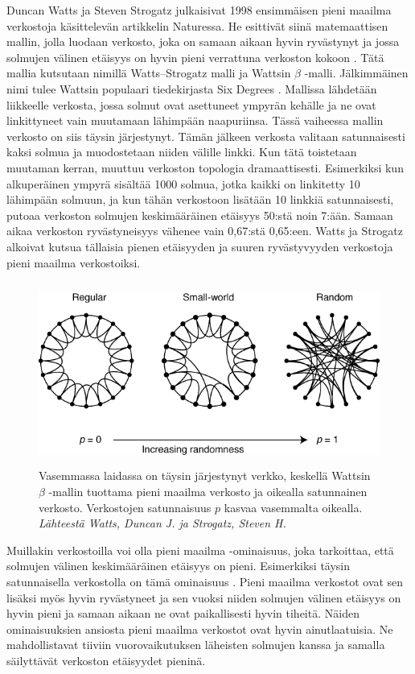 \documentclass[finnish,12pt,a4paper,pdftex,elec,utf8]{aaltothesis}
\begin{document}
Duncan Watts ja Steven Strogatz julkaisivat 1998 ensimmäisen pieni maailma verkostoja käsittelevän artikkelin Naturessa. He esittivät siinä matemaattisen mallin, jolla luodaan verkosto, joka on samaan aikaan hyvin ryvästynyt ja jossa solmujen välinen etäisyys on hyvin pieni verrattuna verkoston kokoon \cite{Collective-dynamics}. Tätä mallia kutsutaan nimillä Watts–Strogatz malli ja Wattsin $\beta$ -malli. Jälkimmäinen nimi tulee Wattsin populaari tiedekirjasta Six Degrees \cite{Six-Degrees}. Mallissa lähdetään liikkeelle verkosta, jossa solmut ovat asettuneet ympyrän kehälle ja ne ovat linkittyneet vain muutamaan lähimpään naapuriinsa. Tässä vaiheessa mallin verkosto on siis täysin järjestynyt. Tämän jälkeen verkosta valitaan satunnaisesti kaksi solmua ja muodostetaan niiden välille linkki. Kun tätä toistetaan muutaman kerran, muuttuu verkoston topologia dramaattisesti. Esimerkiksi kun alkuperäinen ympyrä sisältää 1000 solmua, jotka kaikki on linkitetty 10 lähimpään solmuun, ja kun tähän verkostoon lisätään 10 linkkiä satunnaisesti, putoaa verkoston solmujen keskimääräinen etäisyys 50:stä noin 7:ään. Samaan aikaa verkoston ryvästyneisyys vähenee vain 0,67:stä 0,65:een. Watts ja Strogatz alkoivat kutsua tällaisia pienen etäisyyden ja suuren ryvästyvyyden verkostoja pieni maailma verkostoiksi. \cite{Collective-dynamics}


\begin{figure}[htb]
\centering \includegraphics[height=6cm]{Kuva_Collectived_namics_1}
\caption{Vasemmassa laidassa on täysin järjestynyt verkko, keskellä Wattsin $\beta$ -mallin tuottama pieni maailma verkosto ja oikealla satunnainen verkosto. Verkostojen satunnaisuus $p$ kasvaa vasemmalta oikealla. \emph{Lähteestä Watts, Duncan J. ja Strogatz, Steven H. \cite{Collective-dynamics}}\label{fig:Collectived_namics_1}}
\end{figure}


Muillakin verkostoilla voi olla pieni maailma -ominaisuus, joka tarkoittaa, että solmujen välinen keskimääräinen etäisyys on pieni. Esimerkiksi täysin satunnaisella verkostolla on tämä ominaisuus \cite[45]{Nexus}. Pieni maailma verkostot ovat sen lisäksi myös hyvin ryvästyneet ja sen vuoksi niiden solmujen välinen etäisyys on hyvin pieni ja samaan aikaan ne ovat paikallisesti hyvin tiheitä. Näiden ominaisuuksien ansiosta pieni maailma verkostot ovat hyvin ainutlaatuisia. Ne mahdollistavat tiiviin vuorovaikutuksen läheisten solmujen kanssa ja samalla säilyttävät verkoston etäisyydet pieninä.
\end{document}
